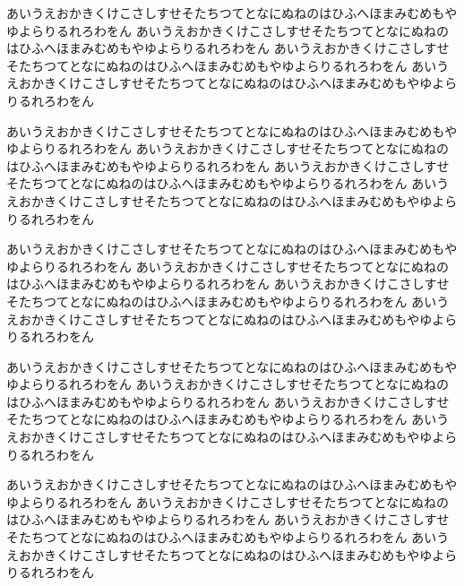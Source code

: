 \documentclass{jspf}            %
\begin{document}
あいうえおかきくけこさしすせそたちつてとなにぬねのはひふへほまみむめもやゆよらりるれろわをん
あいうえおかきくけこさしすせそたちつてとなにぬねのはひふへほまみむめもやゆよらりるれろわをん
あいうえおかきくけこさしすせそたちつてとなにぬねのはひふへほまみむめもやゆよらりるれろわをん
あいうえおかきくけこさしすせそたちつてとなにぬねのはひふへほまみむめもやゆよらりるれろわをん

あいうえおかきくけこさしすせそたちつてとなにぬねのはひふへほまみむめもやゆよらりるれろわをん
あいうえおかきくけこさしすせそたちつてとなにぬねのはひふへほまみむめもやゆよらりるれろわをん
あいうえおかきくけこさしすせそたちつてとなにぬねのはひふへほまみむめもやゆよらりるれろわをん
あいうえおかきくけこさしすせそたちつてとなにぬねのはひふへほまみむめもやゆよらりるれろわをん

あいうえおかきくけこさしすせそたちつてとなにぬねのはひふへほまみむめもやゆよらりるれろわをん
あいうえおかきくけこさしすせそたちつてとなにぬねのはひふへほまみむめもやゆよらりるれろわをん
あいうえおかきくけこさしすせそたちつてとなにぬねのはひふへほまみむめもやゆよらりるれろわをん
あいうえおかきくけこさしすせそたちつてとなにぬねのはひふへほまみむめもやゆよらりるれろわをん

あいうえおかきくけこさしすせそたちつてとなにぬねのはひふへほまみむめもやゆよらりるれろわをん
あいうえおかきくけこさしすせそたちつてとなにぬねのはひふへほまみむめもやゆよらりるれろわをん
あいうえおかきくけこさしすせそたちつてとなにぬねのはひふへほまみむめもやゆよらりるれろわをん
あいうえおかきくけこさしすせそたちつてとなにぬねのはひふへほまみむめもやゆよらりるれろわをん

あいうえおかきくけこさしすせそたちつてとなにぬねのはひふへほまみむめもやゆよらりるれろわをん
あいうえおかきくけこさしすせそたちつてとなにぬねのはひふへほまみむめもやゆよらりるれろわをん
あいうえおかきくけこさしすせそたちつてとなにぬねのはひふへほまみむめもやゆよらりるれろわをん
あいうえおかきくけこさしすせそたちつてとなにぬねのはひふへほまみむめもやゆよらりるれろわをん
\end{document}
